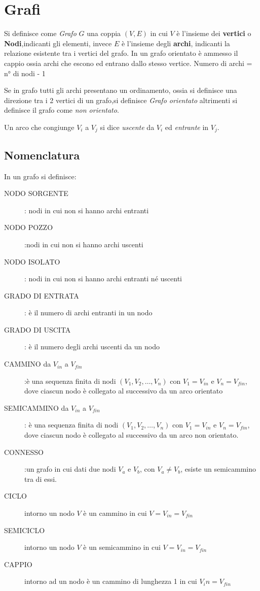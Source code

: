 \section{Grafi}
Si definisce come \emph{Grafo} $G$ una coppia $(V,E)$ in cui $V$ è l'insieme
dei \textbf{vertici} o \textbf{Nodi},indicanti gli elementi, invece $E$
 è l'insieme degli \textbf{archi}, indicanti la relazione esistente tra i vertici del grafo.\newline
In un grafo orientato è ammesso il cappio ossia archi che escono ed entrano dallo stesso vertice.\newline
Numero di archi = n° di nodi - 1

Se in grafo tutti gli archi presentano un ordinamento, ossia si definisce una direzione
tra i 2 vertici di un grafo,si definisce \emph{Grafo orientato}
altrimenti si definisce il grafo come \emph{non orientato}.

Un arco che congiunge $V_i$ a $V_j$ si dice \emph{uscente} da $V_i$ ed \emph{entrante} in $V_j$.

\subsection{Nomenclatura}
In un grafo si definisce:
\begin{description}
    \item[NODO SORGENTE]: nodi in cui non si hanno archi entranti
    \item[NODO POZZO]:nodi in cui non si hanno archi uscenti
    \item[NODO ISOLATO]: nodi in cui non si hanno archi entranti né uscenti
    \item[GRADO DI ENTRATA]: è il numero di archi entranti in un nodo
    \item[GRADO DI USCITA]: è il numero degli archi uscenti da un nodo
    \item[CAMMINO da $V_{in}$ a $V_{fin}$]:è una sequenza finita di nodi $(V_1,V_2,\dots,V_n)$
     con $V_1 = V_{in}$ e $V_n = V_{fin}$, dove ciascun nodo è collegato al successivo da un arco orientato
    \item[SEMICAMMINO da $V_{in}$ a $V_{fin}$]: è una sequenza finita di nodi
     $(V_1,V_2,\dots,V_n)$ con $V_1 = V_{in}$ e $V_n = V_{fin}$, dove ciascun nodo
     è collegato al successivo da un arco non orientato.
    \item[CONNESSO]:un grafo in cui dati due nodi $V_a$ e $V_b$, con $V_a \neq V_b$,
                    esiste un semicammino tra di essi.
    \item[CICLO]intorno un nodo $V$ è un cammino in cui $V = V_{in} = V_{fin}$
    \item[SEMICICLO]intorno un nodo $V$ è un semicammino in cui $V = V_{in} = V_{fin}$
    \item[CAPPIO]intorno ad un nodo è un cammino di lunghezza 1 in cui $V_in = V_{fin}$
\end{description}

